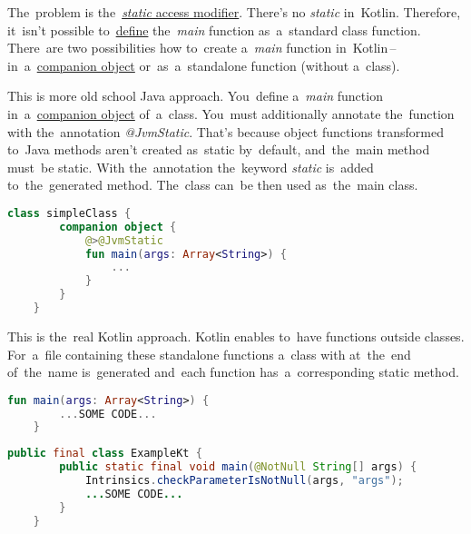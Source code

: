 \noindent The~problem is the~\hyperref[javastatic]{\textit{static} access modifier}.
There's no \textit{static} in~Kotlin.
Therefore, it~isn't possible to~\hyperref[declarationdefinition]{define} the~\textit{main} function as~a~standard class function.
There~are two possibilities how to~create a~\textit{main} function in~Kotlin\,--\,in~a~\hyperref[companionobject]{companion object} or~as~a~standalone function (without a~class).

This is more old school Java approach.
You~define a~\textit{main} function in~a~\hyperref[companionobject]{companion object} of~a~class.
You~must additionally annotate the~function with the~annotation \textit{@JvmStatic}.
That's because object functions transformed to~Java methods aren't created as~static by~default, and~the~main method must~be static.
With the~annotation the~keyword \textit{static} is~added to~the~generated method.
The~class can~be then used as~the~main class.

\begin{lstlisting}[language=Kotlin]
    class simpleClass {
        companion object {
            @>@JvmStatic
            fun main(args: Array<String>) {
                ...
            }
        }
    }
\end{lstlisting}

This is the~real Kotlin approach.
Kotlin enables to~have functions outside classes.
For~a~file containing these standalone functions a~class with  at~the~end of~the~name is~generated and~each function has~a~corresponding static method.

\begin{lstlisting}[language=Kotlin]
    fun main(args: Array<String>) {
        ...SOME CODE...
    }
\end{lstlisting}

\begin{lstlisting}[language=Java]
    public final class ExampleKt {
        public static final void main(@NotNull String[] args) {
            Intrinsics.checkParameterIsNotNull(args, "args");
            ...SOME CODE...
        }
    }
\end{lstlisting}
